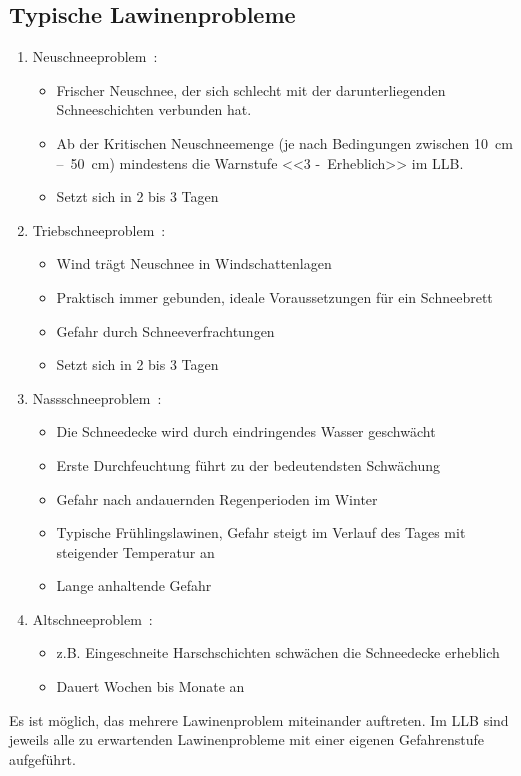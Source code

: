 \subsection{Typische Lawinenprobleme}\label{lawinenprobleme}

\begin{enumerate}
  \item Neuschneeproblem~\cite{achtunglawine}:
  \begin{itemize}
    \item Frischer Neuschnee, der sich schlecht mit der darunterliegenden Schneeschichten verbunden hat. 
    \item Ab der Kritischen Neuschneemenge (je nach Bedingungen zwischen \qty{10}{cm} --~\qty{50}{cm}) mindestens die Warnstufe <<3 -~Erheblich>> im LLB.\@
    \item Setzt sich in 2 bis 3 Tagen
  \end{itemize}
  \item Triebschneeproblem~\cite{achtunglawine}:
  \begin{itemize}
    \item Wind trägt Neuschnee in Windschattenlagen
    \item Praktisch immer gebunden, ideale Voraussetzungen für ein Schneebrett
    \item Gefahr durch Schneeverfrachtungen
    \item Setzt sich in 2 bis 3 Tagen
  \end{itemize}
  \item Nassschneeproblem~\cite{achtunglawine}:
  \begin{itemize}
    \item Die Schneedecke wird durch eindringendes Wasser geschwächt
    \item Erste Durchfeuchtung führt zu der bedeutendsten Schwächung
    \item Gefahr nach andauernden Regenperioden im Winter
    \item Typische Frühlingslawinen, Gefahr steigt im Verlauf des Tages mit steigender Temperatur an
    \item Lange anhaltende Gefahr
  \end{itemize}
  \item Altschneeproblem~\cite{achtunglawine}:
  \begin{itemize}
    \item z.B. Eingeschneite Harschschichten schwächen die Schneedecke erheblich
    \item Dauert Wochen bis Monate an
  \end{itemize}
\end{enumerate}
Es ist möglich, das mehrere Lawinenproblem miteinander auftreten. Im LLB sind jeweils alle zu erwartenden Lawinenprobleme mit einer eigenen Gefahrenstufe aufgeführt.~\cite{slfTypischeLawinenprobleme}

